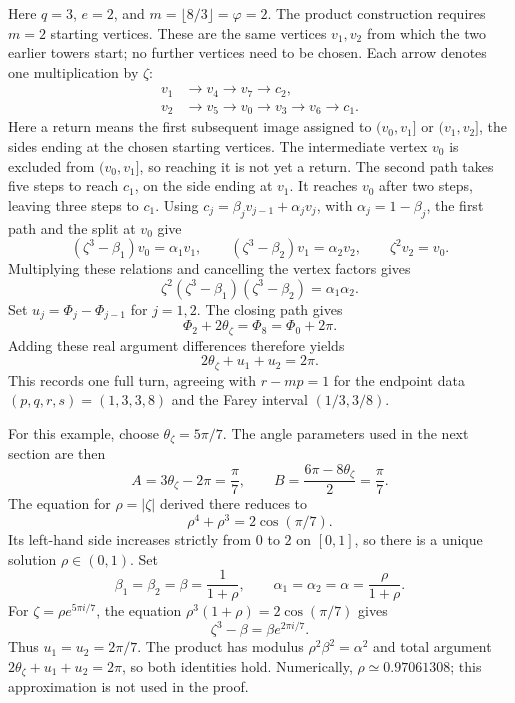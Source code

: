\documentclass[11pt,a4paper]{article}
\theoremstyle{definition}
\theoremstyle{remark}
\numberwithin{equation}{section}
\begin{document}
Here $q=3$, $e=2$, and $m=\lfloor8/3\rfloor=\varphi=2$. The product construction requires $m=2$ starting vertices. These are the same vertices $v_1,v_2$ from which the two earlier towers start; no further vertices need to be chosen. Each arrow denotes one multiplication by $\zeta$:
\[
 \begin{aligned}
 v_1&\longrightarrow v_4\longrightarrow v_7\longrightarrow c_2,\\
 v_2&\longrightarrow v_5\longrightarrow v_0\longrightarrow v_3
       \longrightarrow v_6\longrightarrow c_1.
 \end{aligned}
\]
Here a return means the first subsequent image assigned to $(v_0,v_1]$ or $(v_1,v_2]$, the sides ending at the chosen starting vertices. The intermediate vertex $v_0$ is excluded from $(v_0,v_1]$, so reaching it is not yet a return. The second path takes five steps to reach $c_1$, on the side ending at $v_1$. It reaches $v_0$ after two steps, leaving three steps to $c_1$. Using $c_j=\beta_jv_{j-1}+\alpha_jv_j$, with $\alpha_j=1-\beta_j$, the first path and the split at $v_0$ give
\[
 (\zeta^3-\beta_1)v_0=\alpha_1v_1,\qquad
 (\zeta^3-\beta_2)v_1=\alpha_2v_2,\qquad
 \zeta^2v_2=v_0.
\]
Multiplying these relations and cancelling the vertex factors gives
\[
 \zeta^2(\zeta^3-\beta_1)(\zeta^3-\beta_2)=\alpha_1\alpha_2.
\]
Set $u_j=\Phi_j-\Phi_{j-1}$ for $j=1,2$. The closing path gives
\[
 \Phi_2+2\theta_\zeta=\Phi_8=\Phi_0+2\pi.
\]
Adding these real argument differences therefore yields
\[
 2\theta_\zeta+u_1+u_2=2\pi.
\]
This records one full turn, agreeing with $r-mp=1$ for the endpoint data $(p,q,r,s)=(1,3,3,8)$ and the Farey interval $(1/3,3/8)$.

For this example, choose $\theta_\zeta=5\pi/7$. The angle parameters used in the next section are then
\[
 A=3\theta_\zeta-2\pi=\frac\pi7,\qquad
 B=\frac{6\pi-8\theta_\zeta}{2}=\frac\pi7.
\]
The equation for $\rho=|\zeta|$ derived there reduces to
\[
 \rho^4+\rho^3=2\cos(\pi/7).
\]
Its left-hand side increases strictly from $0$ to $2$ on $[0,1]$, so there is a unique solution $\rho\in(0,1)$. Set
\[
 \beta_1=\beta_2=\beta=\frac1{1+\rho},\qquad
 \alpha_1=\alpha_2=\alpha=\frac{\rho}{1+\rho}.
\]
For $\zeta=\rho e^{5\pi i/7}$, the equation $\rho^3(1+\rho)=2\cos(\pi/7)$ gives
\[
 \zeta^3-\beta=\beta e^{2\pi i/7}.
\]
Thus $u_1=u_2=2\pi/7$. The product has modulus $\rho^2\beta^2=\alpha^2$ and total argument $2\theta_\zeta+u_1+u_2=2\pi$, so both identities hold. Numerically, $\rho\simeq0.97061308$; this approximation is not used in the proof.
\end{document}
